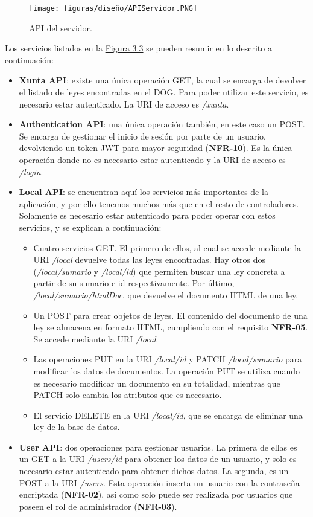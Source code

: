 \begin{figure}[H]
\centerline{\texttt{[image: figuras/diseño/APIServidor.PNG]}}
\caption{API del servidor.}
\label{enlaceAPIServidor}
\end{figure}

Los servicios listados en la \hyperref[enlaceAPIServidor]{Figura 3.3} se pueden resumir en lo descrito a continuación:

\begin{itemize}
    \item {\bf Xunta API}: existe una única operación GET, la cual se encarga de devolver el listado de leyes encontradas en el DOG. Para poder utilizar este servicio, es necesario estar autenticado. La URI de acceso es {\it /xunta}.
    \item {\bf Authentication API}: una única operación también, en este caso un POST. Se encarga de gestionar el inicio de sesión por parte de un usuario, devolviendo un token JWT \cite{jwt} para mayor seguridad ({\bf NFR-10}). Es la única operación donde no es necesario estar autenticado y la URI de acceso es {\it /login}.
    \item {\bf Local API}: se encuentran aquí los servicios más importantes de la aplicación, y por ello tenemos muchos más que en el resto de controladores. Solamente es necesario estar autenticado para poder operar con estos servicios, y se explican a continuación:
        \begin{itemize}
            \item Cuatro servicios GET. El primero de ellos, al cual se accede mediante la URI {\it /local} devuelve todas las leyes encontradas. Hay otros dos ({\it /local/{sumario}} y {\it /local/{id}}) que permiten buscar una ley concreta a partir de su sumario e id respectivamente. Por último, {\it /local/{sumario}/htmlDoc}, que devuelve el documento HTML de una ley.
            \item Un POST para crear objetos de leyes. El contenido del documento de una ley se almacena en formato HTML, cumpliendo con el requisito {\bf NFR-05}. Se accede mediante la URI {\it /local}.
            \item Las operaciones PUT en la URI {\it /local/{id}} y PATCH {\it /local/{sumario}} para modificar los datos de documentos. La operación PUT se utiliza cuando es necesario modificar un documento en su totalidad, mientras que PATCH solo cambia los atributos que es necesario.
            \item El servicio DELETE en la URI {\it /local/{id}}, que se encarga de eliminar una ley de la base de datos.
        \end{itemize}
    \item {\bf User API}: dos operaciones para gestionar usuarios. La primera de ellas es un GET a la URI {\it /users/{id}} para obtener los datos de un usuario, y solo es necesario estar autenticado para obtener dichos datos. La segunda, es un POST a la URI {\it /users}. Esta operación inserta un usuario con la contraseña encriptada ({\bf NFR-02}), así como solo puede ser realizada por usuarios que poseen el rol de administrador ({\bf NFR-03}).
\end{itemize}